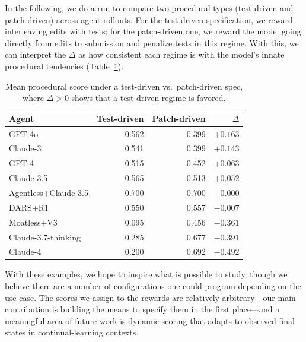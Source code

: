 \documentclass[11pt]{article}
\begin{document}
  In the following, we do a run to compare two procedural types (test-driven and patch-driven) across agent rollouts. For the test-driven
  specification, we reward interleaving edits with tests; for the patch-driven one, we reward the model going directly from edits to submission
  and penalize tests in this regime. With this, we can interpret the $\Delta$ as how consistent each regime is with the model's innate
  procedural tendencies (Table~\ref{tab:spec_comparison}).

  \begin{table}[H]
  \centering\small
  \begin{tabular}{lrrr}
  \toprule
  \textbf{Agent} & \textbf{Test-driven} & \textbf{Patch-driven} & \textbf{$\Delta$} \\
  \midrule
  \rowcolor{gptbg}    GPT-4o                & 0.562 & 0.399 & $+0.163$ \\
  \rowcolor{claudebg} Claude-3              & 0.541 & 0.399 & $+0.143$ \\
  \rowcolor{gptbg}    GPT-4                 & 0.515 & 0.452 & $+0.063$ \\
  \rowcolor{claudebg} Claude-3.5            & 0.565 & 0.513 & $+0.052$ \\
  \rowcolor{owbg}     Agentless+Claude-3.5  & 0.700 & 0.700 & $0.000$ \\
  \rowcolor{owbg}     DARS+R1               & 0.550 & 0.557 & $-0.007$ \\
  \rowcolor{owbg}     Moatless+V3           & 0.095 & 0.456 & $-0.361$ \\
  \rowcolor{claudebg} Claude-3.7-thinking   & 0.285 & 0.677 & $-0.391$ \\
  \rowcolor{claudebg} Claude-4              & 0.200 & 0.692 & $-0.492$ \\
  \bottomrule
  \end{tabular}
  \caption{Mean procedural score under a test-driven vs.\ patch-driven spec, where $\Delta>0$ shows that a test-driven regime is favored.}
  \label{tab:spec_comparison}
  \end{table}

  With these examples, we hope to inspire what is possible to study, though we believe there are a number of configurations one could program
  depending on the use case. The scores we assign to the rewards are relatively arbitrary---our main contribution is building the means to
  specify them in the first place---and a meaningful area of future work is dynamic scoring that adapts to observed final states in
  continual-learning contexts.
\end{document}
